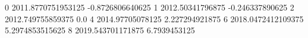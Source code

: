 0 2011.8770751953125 -0.8726806640625
1 2012.50341796875 -0.246337890625
2 2012.749755859375 0.0
4 2014.97705078125 2.227294921875
6 2018.0472412109375 5.2974853515625
8 2019.543701171875 6.7939453125
